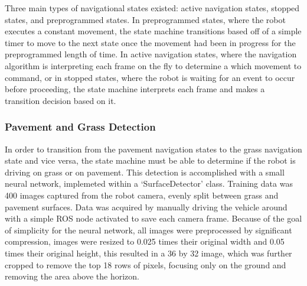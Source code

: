 \documentclass[titlepage, twocolumn]{article}
\begin{document}
        Three main types of navigational states existed: active navigation states, stopped states, and preprogrammed states. In preprogrammed states, where the robot executes a constant movement, the state machine transitions based off of a simple timer to move to the next state once the movement had been in progress for the preprogrammed length of time. In active navigation states, where the navigation algorithm is interpreting each frame on the fly to determine a which movement to command, or in stopped states, where the robot is waiting for an event to occur before proceeding, the state machine interprets each frame and makes a transition decision based on it.

        \subsubsection{Pavement and Grass Detection}
            In order to transition from the pavement navigation states to the grass navigation state and vice versa, the state machine must be able to determine if the robot is driving on grass or on pavement. This detection is accomplished with a small neural network, implemeted within a `SurfaceDetector' class. Training data was 400 images captured from the robot camera, evenly split between grass and pavement surfaces. Data was acquired by manually driving the vehicle around with a simple ROS node activated to save each camera frame. Because of the goal of simplicity for the neural network, all images were preprocessed by significant compression, images were resized to 0.025 times their original width and 0.05 times their original height, this resulted in a 36 by 32 image, which was further cropped to remove the top 18 rows of pixels, focusing only on the ground and removing the area above the horizon.
\end{document}
